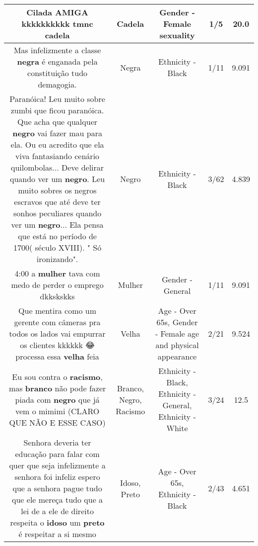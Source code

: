 \documentclass[11pt]{article}
\newlength\mylength
\begin{document}
\begin{center}
\begin{longtable}{|C{.65\mylength}|C{.30\mylength}|C{.12\mylength}|C{.12\mylength}|C{.12\mylength}|}
  \small Cilada AMIGA  kkkkkkkkkk tmnc cadela\normalsize   & Cadela & Gender - Female sexuality & 1/5 & 20.0 \\  \hline
  \small Mas infelizmente a classe \textbf{negra} é enganada pela constituição tudo demagogia.\normalsize   & Negra & Ethnicity - Black & 1/11 & 9.091 \\  \hline
  \small Paranóica! Leu muito sobre zumbi que ficou paranóica. Que acha que qualquer \textbf{negro} vai fazer mau para ela. Ou eu acredito que ela viva fantasiando cenário quilombolas...  Deve delirar quando ver um \textbf{negro}. Leu muito sobres os negros escravos que até deve ter sonhos peculiares quando ver um \textbf{negro}... Ela pensa que está no período de 1700( século XVIII). " Só ironizando".\normalsize   & Negro & Ethnicity - Black & 3/62 & 4.839 \\  \hline
  \small 4:00 a \textbf{mulher} tava com medo de perder o emprego dkkskskks\normalsize   & Mulher & Gender - General & 1/11 & 9.091 \\  \hline
  \small Que mentira como um gerente com câmeras pra todos os lados vai empurrar os clientes kkkkkk 😂 processa essa \textbf{v\textbf{elha}} feia\normalsize   & Velha & Age - Over 65s, Gender - Female age and physical appearance & 2/21 & 9.524 \\  \hline
  \small Eu sou contra o \textbf{racismo}, mas \textbf{branco} não pode fazer piada com \textbf{negro} que já vem o mimimi (CLARO QUE NÃO E ESSE CASO)\normalsize   & Branco, Negro, Racismo & Ethnicity - Black, Ethnicity - General, Ethnicity - White & 3/24 & 12.5 \\  \hline
  \small Senhora deveria ter educação para  falar com quer que seja infelizmente a senhora foi infeliz espero que a senhora pague tudo que ele mereça tudo que a lei de a ele de direito respeita o \textbf{idoso} um \textbf{preto} é respeitar a si mesmo\normalsize   & Idoso, Preto & Age - Over 65s, Ethnicity - Black & 2/43 & 4.651 \\  \hline

\end{longtable}
\end{center}
\end{document}
